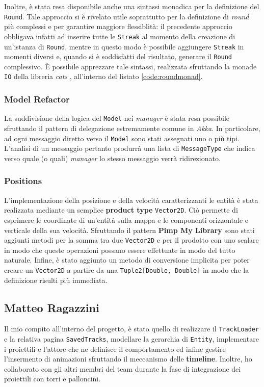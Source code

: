 Inoltre, è stata resa disponibile anche una sintassi monadica per la definizione del \texttt{Round}. Tale approccio si è
rivelato utile soprattutto per la definizione di \textit{round} più complessi e per garantire maggiore flessiblità: il
precedente approccio obbligava infatti ad inserire tutte le \texttt{Streak} al momento della creazione di un'istanza di
\texttt{Round}, mentre in questo modo è possibile aggiungere \texttt{Streak} in momenti diversi e, quando si è
soddisfatti del risultato, generare il \texttt{Round} complessivo. È possibile apprezzare tale sintassi, realizzata
sfruttando la monade \texttt{IO} della libreria \textit{cats} \cite{cats-effects}, all'interno del listato
\ref{code:roundmonad}.


\subsubsection{Model Refactor}
La suddivisione della logica del \texttt{Model} nei \textit{manager} è stata resa possibile sfruttando il pattern di
delegazione estremamente comune in \textit{Akka}. In particolare, ad ogni messaggio diretto verso il \texttt{Model} sono
stati assegnati uno o più tipi. L'analisi di un messaggio pertanto produrrà una lista di \texttt{MessageType} che indica
verso quale (o quali) \textit{manager} lo stesso messaggio verrà ridirezionato.

\subsubsection{Positions}
L'implementazione della posizione e della velocità caratterizzanti le entità è stata realizzata mediante un semplice
\textbf{product type} \texttt{Vector2D}. Ciò permette di esprimere le coordinate di un'entità sulla mappa e le
componenti orizzontale e verticale della sua velocità. Sfruttando il pattern \textbf{Pimp My Library} sono stati
aggiunti metodi per la somma tra due \texttt{Vector2D} e per il prodotto con uno scalare in modo che queste operazioni
possano essere effettuate in modo del tutto naturale. Infine, è stato aggiunto un metodo di conversione implicita per
poter creare un \texttt{Vector2D} a partire da una \texttt{Tuple2[Double, Double]} in modo che la definizione risulti
più immediata.

\subsection{Matteo Ragazzini}\label{subsec:matteo-ragazzini}
Il mio compito all'interno del progetto, è stato quello di realizzare il \texttt{TrackLoader} e la relativa pagina
\texttt{SavedTracks}, modellare la gerarchia di \texttt{Entity},  implementare i proiettili e l'attore che
ne definisce il comportamento ed infine gestire l'insermento di animazioni sfruttando il meccanismo delle \textbf{timeline}.
Inoltre, ho collaborato con gli altri membri del team durante la fase di integrazione dei proiettili con torri e palloncini.


